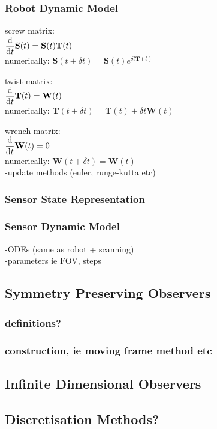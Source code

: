 				
	\subsubsection{Robot Dynamic Model}
		screw matrix:\\
		$ \dfrac{\textnormal{d}}{\textnormal{d}t}\mathbf{S}(t)=\mathbf{S}(t)\mathbf{T}(t)$\\
		numerically: $\mathbf{S}(t+\delta t) = \mathbf{S}(t)e^{\delta t\mathbf{T}(t)}$
		
		twist matrix:\\
		$ \dfrac{\textnormal{d}}{\textnormal{d}t}\mathbf{T}(t)=\mathbf{W}(t)$\\
		numerically: $\mathbf{T}(t+\delta t) = \mathbf{T}(t) + \delta t\mathbf{W}(t)$
		
		wrench matrix:\\
		$ \dfrac{\textnormal{d}}{\textnormal{d}t}\mathbf{W}(t)=0$\\
		numerically: $\mathbf{W}(t+\delta t) = \mathbf{W}(t)$\\
		-update methods (euler, runge-kutta etc)
		
	\subsubsection{Sensor State Representation}
		
	\subsubsection{Sensor Dynamic Model}
		-ODEs (same as robot + scanning)\\
		-parameters ie FOV, steps
		
\subsection{Symmetry Preserving Observers}
	\subsubsection{definitions?}
	\subsubsection{construction, ie moving frame method etc}
\subsection{Infinite Dimensional Observers}
\subsection{Discretisation Methods?}